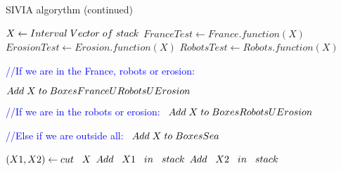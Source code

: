 \begin{algorithm}
  \caption{SIVIA algorythm (continued)}
  \begin{algorithmic}
	
		\vspace{0.3 cm}
	
  		\STATE $X\gets Interval \hspace{0.1cm} Vector \hspace{0.1cm} of \hspace{0.1cm} stack$
		\STATE $FranceTest\gets France.function(X)$
		\STATE $ErosionTest\gets Erosion.function(X)$ 
		\STATE $RobotsTest\gets Robots.function(X)$

		\vspace{0.3 cm}

  	 	\textcolor{blue}{//If we are in the France, robots or erosion:}\
	 	
     	  	\STATE $Add \hspace{0.1cm} X \hspace{0.1cm} to \hspace{0.1cm} BoxesFranceURobotsUErosion$
     	
	 	\vspace{0.3 cm}
	 	
	 	\textcolor{blue}{//If we are in the robots or erosion:}\
     		\STATE $Add \hspace{0.1cm} X \hspace{0.1cm} to \hspace{0.1cm} BoxesRobotsUErosion$
	 	 
	
	 	 \ENDIF
	 	 
	 	 \vspace{0.3 cm}
     		
     	\textcolor{blue}{//Else if we are outside all:}\
	 	 \STATE $Add \hspace{0.1cm} X \hspace{0.1cm} to \hspace{0.1cm} BoxesSea$
	 	 
     	\ELSE
     
      	\vspace{0.3 cm}
          			\STATE $(X1, X2)\gets cut \hspace{0.3cm}  X$
          			\STATE $Add \hspace{0.3cm}  X1 \hspace{0.3cm}  in \hspace{0.3cm}  stack$
         			\STATE $Add \hspace{0.3cm}  X2 \hspace{0.3cm}  in \hspace{0.3cm}  stack$
         		\ENDIF
         	

\end{algorithmic}
\end{algorithm}
